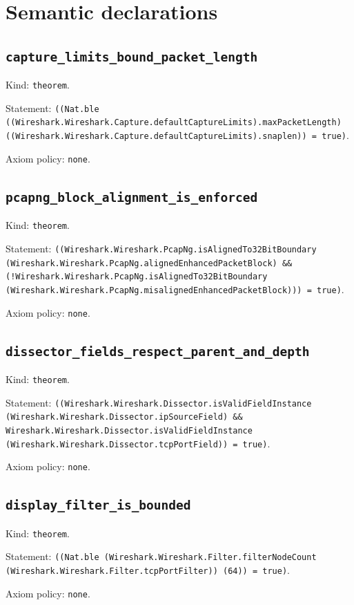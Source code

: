 \documentclass[11pt]{article}
\begin{document}
\section*{Semantic declarations}
\subsection*{\texttt{capture\_limits\_bound\_packet\_length}}
\noindent Kind: \texttt{theorem}.\par
\noindent Statement: \texttt{((Nat.ble ((Wireshark.Wireshark.Capture.defaultCaptureLimits).maxPacketLength) ((Wireshark.Wireshark.Capture.defaultCaptureLimits).snaplen)) = true)}.\par
\noindent Axiom policy: \texttt{none}.\par
\subsection*{\texttt{pcapng\_block\_alignment\_is\_enforced}}
\noindent Kind: \texttt{theorem}.\par
\noindent Statement: \texttt{((Wireshark.Wireshark.PcapNg.isAlignedTo32BitBoundary (Wireshark.Wireshark.PcapNg.alignedEnhancedPacketBlock) \&\& (!Wireshark.Wireshark.PcapNg.isAlignedTo32BitBoundary (Wireshark.Wireshark.PcapNg.misalignedEnhancedPacketBlock))) = true)}.\par
\noindent Axiom policy: \texttt{none}.\par
\subsection*{\texttt{dissector\_fields\_respect\_parent\_and\_depth}}
\noindent Kind: \texttt{theorem}.\par
\noindent Statement: \texttt{((Wireshark.Wireshark.Dissector.isValidFieldInstance (Wireshark.Wireshark.Dissector.ipSourceField) \&\& Wireshark.Wireshark.Dissector.isValidFieldInstance (Wireshark.Wireshark.Dissector.tcpPortField)) = true)}.\par
\noindent Axiom policy: \texttt{none}.\par
\subsection*{\texttt{display\_filter\_is\_bounded}}
\noindent Kind: \texttt{theorem}.\par
\noindent Statement: \texttt{((Nat.ble (Wireshark.Wireshark.Filter.filterNodeCount (Wireshark.Wireshark.Filter.tcpPortFilter)) (64)) = true)}.\par
\noindent Axiom policy: \texttt{none}.\par
\end{document}
